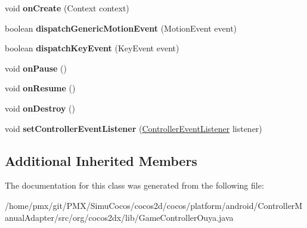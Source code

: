 \begin{DoxyCompactItemize}
void {\bfseries on\+Create} (Context context)
\item 
\mbox{\label{classorg_1_1cocos2dx_1_1lib_1_1GameControllerOuya_ade8287bff579ccc824643256697064e2}} 
boolean {\bfseries dispatch\+Generic\+Motion\+Event} (Motion\+Event event)
\item 
\mbox{\label{classorg_1_1cocos2dx_1_1lib_1_1GameControllerOuya_a10989a5fc6776d5a48538cbace530bab}} 
boolean {\bfseries dispatch\+Key\+Event} (Key\+Event event)
\item 
\mbox{\label{classorg_1_1cocos2dx_1_1lib_1_1GameControllerOuya_a7974849834d9de7a76696ca81495d8a0}} 
void {\bfseries on\+Pause} ()
\item 
\mbox{\label{classorg_1_1cocos2dx_1_1lib_1_1GameControllerOuya_aac94f365014607611e6e37a29aecea5d}} 
void {\bfseries on\+Resume} ()
\item 
\mbox{\label{classorg_1_1cocos2dx_1_1lib_1_1GameControllerOuya_aa3b88113b8907f9ed8fdaadde7d51de8}} 
void {\bfseries on\+Destroy} ()
\item 
\mbox{\label{classorg_1_1cocos2dx_1_1lib_1_1GameControllerOuya_a6d373a816ad5b7b2b5441ce363483f3e}} 
void {\bfseries set\+Controller\+Event\+Listener} (\hyperlink{interfaceorg_1_1cocos2dx_1_1lib_1_1GameControllerDelegate_1_1ControllerEventListener}{Controller\+Event\+Listener} listener)
\end{DoxyCompactItemize}
\subsection*{Additional Inherited Members}


The documentation for this class was generated from the following file\+:\begin{DoxyCompactItemize}
\item 
/home/pmx/git/\+P\+M\+X/\+Simu\+Cocos/cocos2d/cocos/platform/android/\+Controller\+Manual\+Adapter/src/org/cocos2dx/lib/Game\+Controller\+Ouya.\+java\end{DoxyCompactItemize}
